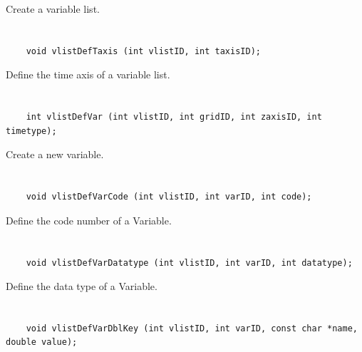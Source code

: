 Create a variable list.


\section*{\tt {}}

\begin{verbatim}
    void vlistDefTaxis (int vlistID, int taxisID);
\end{verbatim}

Define the time axis of a variable list.


\section*{\tt {}}

\begin{verbatim}
    int vlistDefVar (int vlistID, int gridID, int zaxisID, int timetype);
\end{verbatim}

Create a new variable.


\section*{\tt {}}

\begin{verbatim}
    void vlistDefVarCode (int vlistID, int varID, int code);
\end{verbatim}

Define the code number of a Variable.


\section*{\tt {}}

\begin{verbatim}
    void vlistDefVarDatatype (int vlistID, int varID, int datatype);
\end{verbatim}

Define the data type of a Variable.


\section*{\tt {}}

\begin{verbatim}
    void vlistDefVarDblKey (int vlistID, int varID, const char *name, double value);
\end{verbatim}

